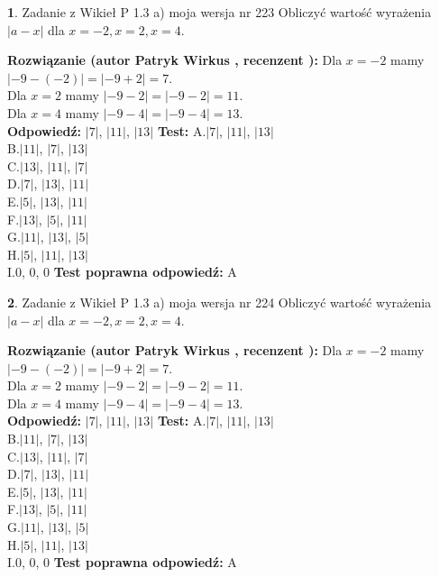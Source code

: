 \documentclass[12pt, a4paper]{article}
\theoremstyle{definition} %
\newtheorem{zad}{}
\newcommand{\zadStart}[1]{\begin{zad}#1\newline}
\newcommand{\zadStop}{\end{zad}}
\newcommand{\rozwStart}[2]{\noindent \textbf{Rozwiązanie (autor #1 , recenzent #2): }\newline}
\newcommand{\rozwStop}{\newline}
\newcommand{\odpStart}{\noindent \textbf{Odpowiedź:}\newline}
\newcommand{\odpStop}{\newline}
\newcommand{\testStart}{\noindent \textbf{Test:}\newline}
\newcommand{\testStop}{\newline}
\newcommand{\kluczStart}{\noindent \textbf{Test poprawna odpowiedź:}\newline}
\newcommand{\kluczStop}{\newline}
\begin{document}
\zadStart{Zadanie z Wikieł P 1.3 a) moja wersja nr 223}
Obliczyć wartość wyrażenia $|a - x|$ dla $x=-2,x=2,x=4$.
\zadStop
\rozwStart{Patryk Wirkus}{}
Dla $x = -2$ mamy $|-9 - (-2)| = |-9 + 2| = 7$.\\
Dla $x = 2$ mamy $|-9 - 2| = |-9 - 2| = 11$.\\
Dla $x = 4$ mamy $|-9 - 4| = |-9 - 4| = 13$.\\
\rozwStop
\odpStart
$|7|$, $|11|$, $|13|$
\odpStop
\testStart
A.$|7|$, $|11|$, $|13|$\\
B.$|11|$, $|7|$, $|13|$\\
C.$|13|$, $|11|$, $|7|$\\
D.$|7|$, $|13|$, $|11|$\\
E.$|5|$, $|13|$, $|11|$\\
F.$|13|$, $|5|$, $|11|$\\
G.$|11|$, $|13|$, $|5|$\\
H.$|5|$, $|11|$, $|13|$\\
I.$0$, $0$, $0$
\testStop
\kluczStart
A
\kluczStop



\zadStart{Zadanie z Wikieł P 1.3 a) moja wersja nr 224}
Obliczyć wartość wyrażenia $|a - x|$ dla $x=-2,x=2,x=4$.
\zadStop
\rozwStart{Patryk Wirkus}{}
Dla $x = -2$ mamy $|-9 - (-2)| = |-9 + 2| = 7$.\\
Dla $x = 2$ mamy $|-9 - 2| = |-9 - 2| = 11$.\\
Dla $x = 4$ mamy $|-9 - 4| = |-9 - 4| = 13$.\\
\rozwStop
\odpStart
$|7|$, $|11|$, $|13|$
\odpStop
\testStart
A.$|7|$, $|11|$, $|13|$\\
B.$|11|$, $|7|$, $|13|$\\
C.$|13|$, $|11|$, $|7|$\\
D.$|7|$, $|13|$, $|11|$\\
E.$|5|$, $|13|$, $|11|$\\
F.$|13|$, $|5|$, $|11|$\\
G.$|11|$, $|13|$, $|5|$\\
H.$|5|$, $|11|$, $|13|$\\
I.$0$, $0$, $0$
\testStop
\kluczStart
A
\kluczStop
\end{document}
